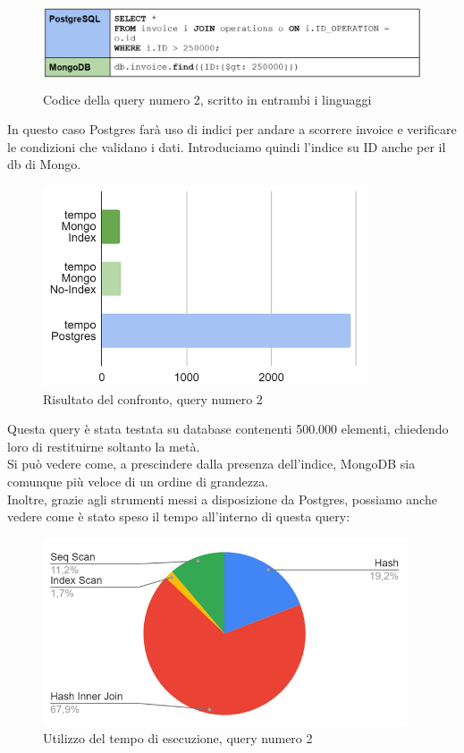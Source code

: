 \begin{figure}[htbp]
\begin{center}
\includegraphics[height=7em]{immagini/query/query2.png}
\caption{Codice della query numero 2, scritto in entrambi i linguaggi}
\end{center}
\end{figure}

\noindent In questo caso Postgres farà uso di indici per andare a scorrere invoice e verificare le condizioni che validano i dati. Introduciamo quindi l'indice su ID anche per il db di Mongo.\\

\begin{figure}[htbp]
\begin{center}
\includegraphics[height=16em]{immagini/query/query2_results1.png}
\caption{Risultato del confronto, query numero 2}
\end{center}
\end{figure}

\noindent Questa query è stata testata su database contenenti 500.000 elementi, chiedendo loro di restituirne soltanto la metà.\\
Si può vedere come, a prescindere dalla presenza dell'indice, MongoDB sia comunque più veloce di un ordine di grandezza.\\
Inoltre, grazie agli strumenti messi a disposizione da Postgres, possiamo anche vedere come è stato speso il tempo all'interno di questa query:

\begin{figure}[htbp]
\begin{center}
\includegraphics[height=15em]{immagini/query/query2_results2.png}
\caption{Utilizzo del tempo di esecuzione, query numero 2}
\end{center}
\end{figure}

